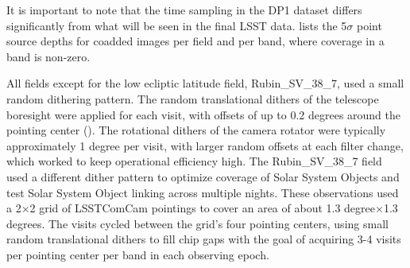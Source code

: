 It is important to note that the time sampling in the \gls{DP1} dataset differs significantly from what will be seen in the final \gls{LSST} data.
 lists the  5$\sigma$ point source depths for coadded images per field and per band, where coverage in a band is non-zero.



All fields except for the low ecliptic latitude field, Rubin\_SV\_38\_7, used a small random dithering pattern.
The random translational dithers of the telescope boresight were applied for each visit, with offsets of up to 0.2 degrees around the pointing center ().
The rotational dithers of the camera rotator were typically approximately 1 degree per visit, with larger random offsets at each filter change, which worked to keep operational efficiency high.
The Rubin\_SV\_38\_7 field used a different dither pattern to optimize coverage of Solar System Objects and test Solar System Object linking across multiple nights.
These observations used a 2$\times$2 grid of \gls{LSSTComCam} pointings to cover an area of about 1.3 degree$\times$1.3 degrees.
The visits cycled between the grid's four pointing centers, using small random translational dithers to fill chip gaps with the goal of acquiring 3-4 visits per pointing center per band in each observing epoch.
